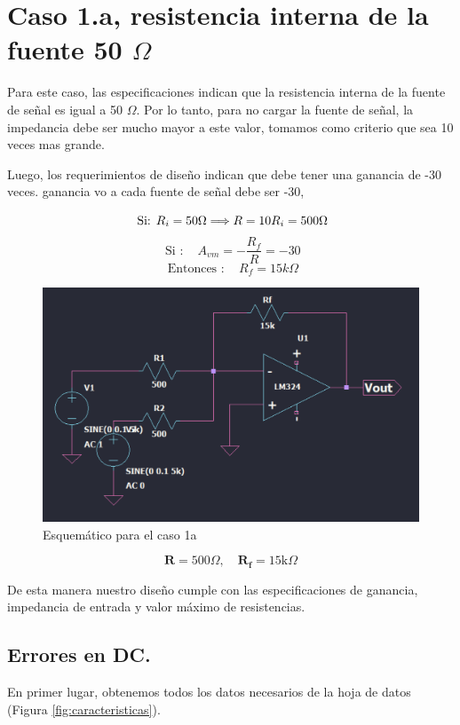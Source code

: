 \section{Caso 1.a, resistencia interna de la fuente 50 \texorpdfstring{$\Omega$}{Ω}}

Para este caso, las especificaciones indican que la resistencia interna de la fuente de señal es igual a 50 $\Omega$. Por lo tanto, para no cargar la fuente de señal, la impedancia debe ser mucho mayor a este valor, tomamos como criterio que sea 10 veces mas grande.

Luego, los requerimientos de diseño indican que debe tener una ganancia de -30 veces. 
ganancia vo a cada fuente de señal debe ser -30, 

\[ \text { Si: } R_{i}=50 \Omega \Longrightarrow R=10 \space R_{i}=500 \Omega \]
\[ \text { Si }: \quad A_{vm} =-\frac{R_{f}}{R}=-30 \]
\[ \text { Entonces }: \quad R_{f}=15 k \Omega \]
\vspace{1em}



\begin{figure}[h!]
    \centering
    \includegraphics[width=0.90\linewidth]{img/caso1a.png}
    \caption{Esquemático para el caso 1a}
    \label{fig:caso1a}
\end{figure}


\[  \mathbf{R}=500 \Omega, \quad \mathbf{R}_{\mathbf{f}}=15 \mathrm{k} \Omega \]


De esta manera nuestro diseño cumple con las especificaciones de ganancia, impedancia de entrada y valor máximo de resistencias.

\vspace{1em}

\subsection{Errores en DC.}
En primer lugar, obtenemos todos los datos necesarios de la hoja de datos (Figura \ref{fig:caracteristicas}).

